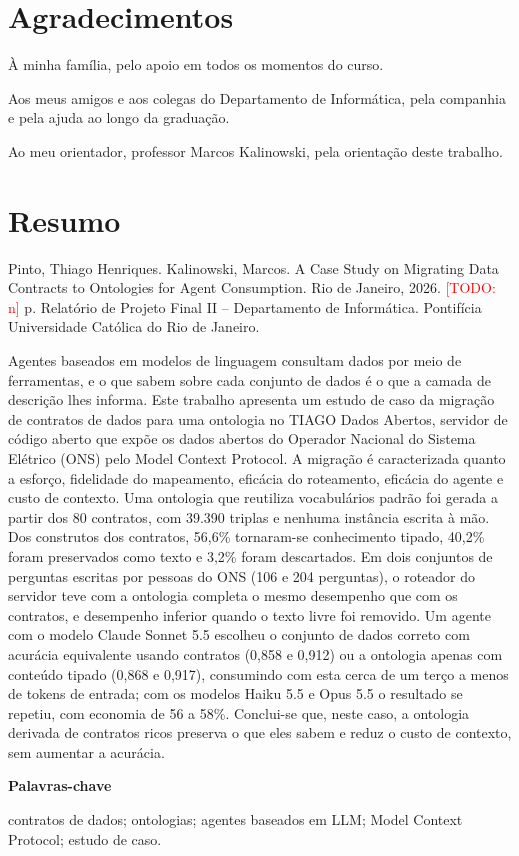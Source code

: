 \documentclass[11pt,a4paper,oneside]{report}
\newcommand{\todo}[1]{\textcolor{red}{[TODO: #1]}}
\newcommand{\thesistitle}{A Case Study on Migrating Data Contracts to Ontologies for Agent Consumption}
\begin{document}
\section*{Agradecimentos}
\`A minha fam\'ilia, pelo apoio em todos os momentos do curso.

Aos meus amigos e aos colegas do Departamento de Inform\'atica, pela companhia e pela ajuda
ao longo da gradua\c{c}\~ao.

Ao meu orientador, professor Marcos Kalinowski, pela orienta\c{c}\~ao deste trabalho.
\clearpage

\section*{Resumo}
\begin{singlespace}
\noindent Pinto, Thiago Henriques. Kalinowski, Marcos. \thesistitle. Rio de Janeiro, 2026.
\todo{n} p. Relat\'orio de Projeto Final II -- Departamento de Inform\'atica.
Pontif\'icia Universidade Cat\'olica do Rio de Janeiro.

\vspace{1em}
\noindent Agentes baseados em modelos de linguagem consultam dados por meio de ferramentas, e
o que sabem sobre cada conjunto de dados \'e o que a camada de descri\c{c}\~ao lhes informa.
Este trabalho apresenta um estudo de caso da migra\c{c}\~ao de contratos de dados para uma
ontologia no TIAGO Dados Abertos, servidor de c\'odigo aberto que exp\~oe os dados abertos do
Operador Nacional do Sistema El\'etrico (ONS) pelo Model Context Protocol. A migra\c{c}\~ao
\'e caracterizada quanto a esfor\c{c}o, fidelidade do mapeamento, efic\'acia do roteamento,
efic\'acia do agente e custo de contexto. Uma ontologia que reutiliza vocabul\'arios padr\~ao
foi gerada a partir dos 80 contratos, com 39.390 triplas e nenhuma inst\^ancia escrita \`a
m\~ao. Dos construtos dos contratos, 56,6\% tornaram-se conhecimento tipado, 40,2\% foram
preservados como texto e 3,2\% foram descartados. Em dois conjuntos de perguntas escritas
por pessoas do ONS (106 e 204 perguntas), o roteador do servidor teve com a ontologia
completa o mesmo desempenho que com os contratos, e desempenho inferior quando o texto livre
foi removido. Um agente com o modelo Claude Sonnet 5.5 escolheu o conjunto de dados correto
com acur\'acia equivalente usando contratos (0,858 e 0,912) ou a ontologia apenas com
conte\'udo tipado (0,868 e 0,917), consumindo com esta cerca de um ter\c{c}o a menos de
tokens de entrada; com os modelos Haiku 5.5 e Opus 5.5 o resultado se repetiu, com economia
de 56 a 58\%. Conclui-se que, neste caso, a ontologia derivada de contratos ricos
preserva o que eles sabem e reduz o custo de contexto, sem aumentar a acur\'acia.

\vspace{1em}
\noindent\textbf{Palavras-chave}\par
\noindent contratos de dados; ontologias; agentes baseados em LLM; Model Context Protocol; estudo de caso.
\end{singlespace}
\end{document}
